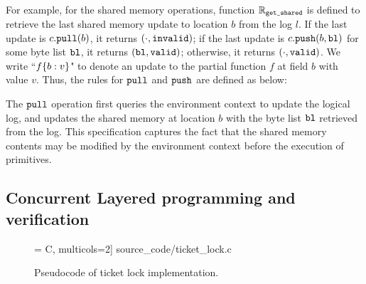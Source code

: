{For example, for the shared memory operations, function
$\mathbb{R}_{{\texttt{get\_shared}}}$  is defined to retrieve the last shared memory
update to location $b$ from the log $l$. If the last update is
$c.{\texttt{pull}}(b)$, it returns $(\cdot, {\texttt{invalid}})$; if the last update
is $c.{\texttt{push}}(b,{\texttt{bl}})$
for some byte list ${\texttt{bl}}$, 
 it returns $({\texttt{bl}}, {\texttt{valid}})$;
otherwise, it returns $(\cdot, {\texttt{valid}})$.
We write ``$f\{b:v\}$"
to denote an update to the partial function $f$ at field $b$ 
with value $v$.
Thus, the rules for ${\texttt{pull}}$ and ${\texttt{push}}$
are defined as below:
\begin{small}
\end{small}

The ${\texttt{pull}}$ operation first queries the environment context to update
the logical log, and updates the shared memory at 
location $b$ with the byte
list ${\texttt{bl}}$ retrieved from the log. This specification
captures the fact that the shared memory contents may be
modified by the environment context before the execution of
primitives.

\subsection{Concurrent Layered programming and verification}
\label{sec:prog:example}}



\begin{figure}[t]
 = C, multicols=2] {source_code/ticket_lock.c}
\caption{Pseudocode of ticket lock implementation.}
\label{fig:exp:ticket_lock}
\hrulefill
\end{figure}

